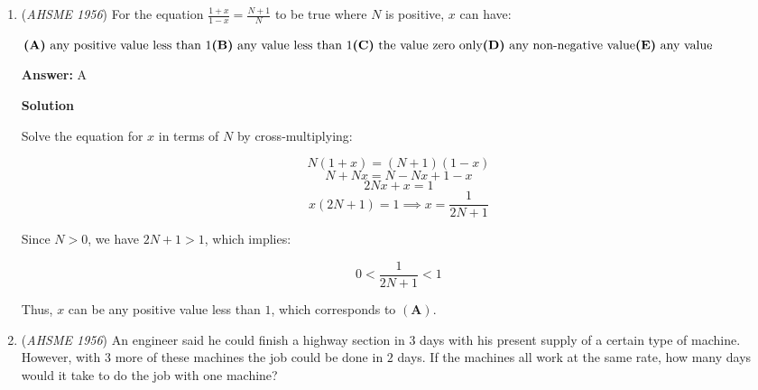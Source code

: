 \begin{enumerate}
 The number of revolutions $N$ needed to cover a fixed distance $D$ (such as one mile) is inversely proportional to the circumference of the wheel $C = 2\pi r$:
 \[N = \frac{D}{2\pi r}\]

 Let $N_1$ and $N_2$ be the initial and new number of revolutions, respectively. The ratio of the new number of revolutions to the initial number is:
 \[\frac{N_2}{N_1} = \frac{r_1}{r_2} = \frac{12.5}{12.25} = \frac{1250}{1225} = \frac{50}{49}\]

 The relative increase in the number of revolutions is:
 \[\frac{N_2 - N_1}{N_1} = \frac{N_2}{N_1} - 1 = \frac{50}{49} - 1 = \frac{1}{49} \approx 0.0204 = 2.04\%\]

 Thus, the number of revolutions will be increased by about $2\%$, which corresponds to $\textbf{(A)}$.

 


	\item (\textit{AHSME 1956}) For the equation $\frac {1 + x}{1 - x} = \frac {N + 1}{N}$ to be true where $N$ is positive, $x$ can have: 


 $\textbf{(A)}\ \text{any positive value less than }1 \qquad \\ \textbf{(B)}\ \text{any value less than }1 \\ \textbf{(C)}\ \text{the value zero only}\qquad \\ \textbf{(D)}\ \text{any non-negative value}\qquad \\ \textbf{(E)}\ \text{any value}$

 \textbf{Answer: }A



\textbf{Solution}

Solve the equation for $x$ in terms of $N$ by cross-multiplying:

 
 \[N(1 + x) = (N + 1)(1 - x)\]
 \[N + Nx = N - Nx + 1 - x\]
 \[2Nx + x = 1\]
 \[x(2N + 1) = 1 \implies x = \frac{1}{2N + 1}\]

 Since $N > 0$, we have $2N + 1 > 1$, which implies:

 
 \[0 < \frac{1}{2N + 1} < 1\]

 Thus, $x$ can be any positive value less than $1$, which corresponds to $\mathbf{(A)}$.

 


	\item (\textit{AHSME 1956}) An engineer said he could finish a highway section in $3$ days with his present supply of a certain type of machine. 
However, with $3$ more of these machines the job could be done in $2$ days. If the machines all work at the same rate, 
how many days would it take to do the job with one machine? 



\end{enumerate}
